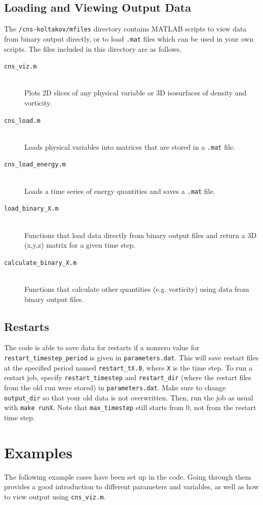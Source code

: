 \documentclass[12pt]{report}
\begin{document}
\section{Loading and Viewing Output Data}
The \texttt{/cns-koltakov/mfiles} directory contains MATLAB scripts to view data from binary output directly, or to load \texttt{.mat} files which can be used in your own scripts. The files included in this directory are as follows.

\begin{description}
\item[\texttt{cns\_viz.m}] \hfill \\Plots 2D slices of any physical variable or 3D isosurfaces of density and vorticity.
\item[\texttt{cns\_load.m}] \hfill \\Loads physical variables into matrices that are stored in a \texttt{.mat} file.
\item[\texttt{cns\_load\_energy.m}] \hfill \\Loads a time series of energy quantities and saves a \texttt{.mat} file.
\item[\texttt{load\_binary\_X.m}] \hfill \\Functions that load data directly from binary output files and return a 3D (x,y,z) matrix for a given time step.
\item[\texttt{calculate\_binary\_X.m}] \hfill \\Functions that calculate other quantities (e.g. vorticity) using data from binary output files.
\end{description}

\section{Restarts}
The code is able to save data for restarts if a nonzero value for \texttt{restart\_timestep\_period} is given in \texttt{parameters.dat}. This will save restart files at the specified period named \texttt{restart\_tX.0}, where \texttt{X} is the time step. To run a restart job, specify \texttt{restart\_timestep} and \texttt{restart\_dir} (where the restart files from the old run were stored) in \texttt{parameters.dat}. Make sure to change \texttt{output\_dir} so that your old data is not overwritten. Then, run the job as usual with \texttt{make runX}. Note that \texttt{max\_timestep} still starts from 0, not from the restart time step.

\chapter{Examples}\label{chap:examples}
The following example cases have been set up in the code. Going through them provides a good introduction to different parameters and variables, as well as how to view output using \texttt{cns\_viz.m}. 
\end{document}
